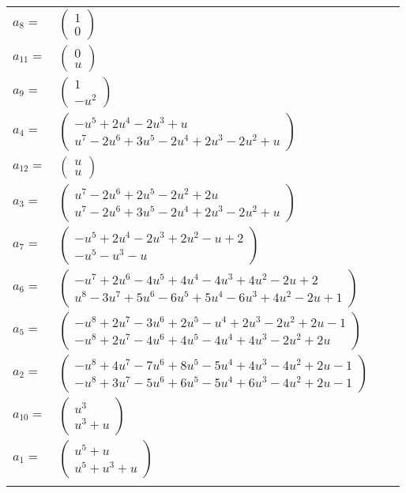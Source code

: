 \documentclass[1p]{elsarticle_modified}
\theoremstyle{definition}
\begin{document}
\begin{tabular}{m{7pt} m{180pt} m{7pt} m{180pt} }
\flushright $a_{8}=$&$\begin{pmatrix}1\\0\end{pmatrix}$ \\
\flushright $a_{11}=$&$\begin{pmatrix}0\\u\end{pmatrix}$ \\
\flushright $a_{9}=$&$\begin{pmatrix}1\\- u^2\end{pmatrix}$ \\
\flushright $a_{4}=$&$\begin{pmatrix}- u^5+2 u^4-2 u^3+u\\u^7-2 u^6+3 u^5-2 u^4+2 u^3-2 u^2+u\end{pmatrix}$ \\
\flushright $a_{12}=$&$\begin{pmatrix}u\\u\end{pmatrix}$ \\
\flushright $a_{3}=$&$\begin{pmatrix}u^7-2 u^6+2 u^5-2 u^2+2 u\\u^7-2 u^6+3 u^5-2 u^4+2 u^3-2 u^2+u\end{pmatrix}$ \\
\flushright $a_{7}=$&$\begin{pmatrix}- u^5+2 u^4-2 u^3+2 u^2- u+2\\- u^5- u^3- u\end{pmatrix}$ \\
\flushright $a_{6}=$&$\begin{pmatrix}- u^7+2 u^6-4 u^5+4 u^4-4 u^3+4 u^2-2 u+2\\u^8-3 u^7+5 u^6-6 u^5+5 u^4-6 u^3+4 u^2-2 u+1\end{pmatrix}$ \\
\flushright $a_{5}=$&$\begin{pmatrix}- u^8+2 u^7-3 u^6+2 u^5- u^4+2 u^3-2 u^2+2 u-1\\- u^8+2 u^7-4 u^6+4 u^5-4 u^4+4 u^3-2 u^2+2 u\end{pmatrix}$ \\
\flushright $a_{2}=$&$\begin{pmatrix}- u^8+4 u^7-7 u^6+8 u^5-5 u^4+4 u^3-4 u^2+2 u-1\\- u^8+3 u^7-5 u^6+6 u^5-5 u^4+6 u^3-4 u^2+2 u-1\end{pmatrix}$ \\
\flushright $a_{10}=$&$\begin{pmatrix}u^3\\u^3+u\end{pmatrix}$ \\
\flushright $a_{1}=$&$\begin{pmatrix}u^5+u\\u^5+u^3+u\end{pmatrix}$\\&\end{tabular}
\end{document}
